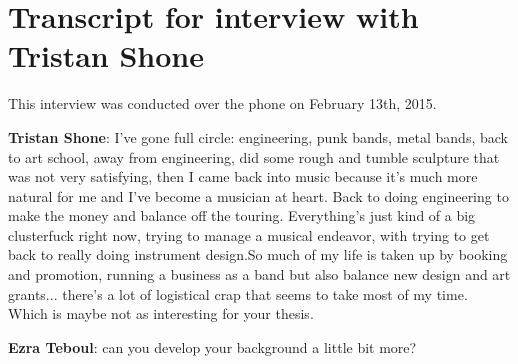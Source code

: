 \section{Transcript for interview with Tristan Shone}

This interview was conducted over the phone on February 13th, 2015. 

\textbf{Tristan Shone}: I've gone full circle: engineering, punk bands, metal bands, back to art school, away from engineering, did some rough and tumble sculpture that was not very satisfying, then I came back into music because it's much more natural for me and I've become a musician at heart. Back to doing engineering to make the money and balance off the touring. Everything's just kind of a big clusterfuck right now, trying to manage a musical endeavor, with trying to get back to really doing instrument design.So much of my life is taken up by booking and promotion, running a business as a band but also balance new design and art grants... there's a lot of logistical crap that seems to take most of my time. Which is maybe not as interesting for your thesis. 

\textbf{Ezra Teboul}: can you develop your background a little bit more?

